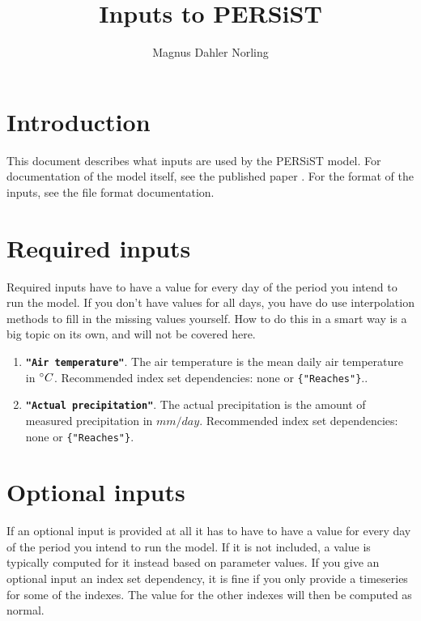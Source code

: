 \documentclass[11pt]{article}
\title{Inputs to PERSiST}
\author{Magnus Dahler Norling}
\theoremstyle{definition}
\begin{document}
\maketitle


\section{Introduction}

This document describes what inputs are used by the PERSiST model. For documentation of the model itself, see the published paper \cite{futter14}. For the format of the inputs, see the file format documentation.

\section{Required inputs}

Required inputs have to have a value for every day of the period you intend to run the model. If you don't have values for all days, you have do use interpolation methods to fill in the missing values yourself. How to do this in a smart way is a big topic on its own, and will not be covered here.

\begin{enumerate}[i]
\item {\bf\tt "Air temperature"}. The air temperature is the mean daily air temperature in $\degree C$. Recommended index set dependencies: none or {\tt \{"Reaches"\}}..
\item {\bf\tt "Actual precipitation"}. The actual precipitation is the amount of measured precipitation in $mm/day$. Recommended index set dependencies: none or {\tt \{"Reaches"\}}.
\end{enumerate}

\section{Optional inputs}

If an optional input is provided at all it has to have to have a value for every day of the period you intend to run the model. If it is not included, a value is typically computed for it instead based on parameter values. If you give an optional input an index set dependency, it is fine if you only provide a timeseries for some of the indexes. The value for the other indexes will then be computed as normal.
\end{document}
